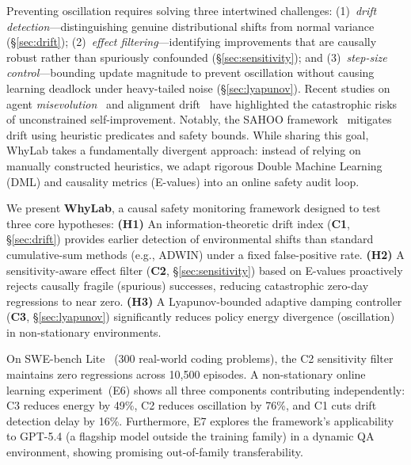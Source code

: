 \documentclass{article}
\begin{document}
Preventing oscillation requires solving three intertwined challenges:
(1)~\emph{drift detection}---distinguishing genuine distributional
shifts from normal variance (\S\ref{sec:drift});
(2)~\emph{effect filtering}---identifying improvements that are
causally robust rather than spuriously confounded
(\S\ref{sec:sensitivity}); and
(3)~\emph{step-size control}---bounding update magnitude to prevent
oscillation without causing learning deadlock under heavy-tailed noise
(\S\ref{sec:lyapunov}).
Recent studies on agent \emph{misevolution}~\cite{misevolution2025} and alignment drift~\cite{sahoo2026sahoo} have highlighted the catastrophic risks of unconstrained self-improvement. Notably, the SAHOO framework~\cite{sahoo2026sahoo} mitigates drift using heuristic predicates and safety bounds. While sharing this goal, WhyLab takes a fundamentally divergent approach: instead of relying on manually constructed heuristics, we adapt rigorous Double Machine Learning (DML) and causality metrics (E-values) into an online safety audit loop.

We present \textbf{WhyLab}, a causal safety monitoring framework designed to test three core hypotheses:
\textbf{(H1)} An information-theoretic drift index (\textbf{C1}, \S\ref{sec:drift}) provides earlier detection of environmental shifts than standard cumulative-sum methods (e.g., ADWIN) under a fixed false-positive rate.
\textbf{(H2)} A sensitivity-aware effect filter (\textbf{C2}, \S\ref{sec:sensitivity}) based on E-values proactively rejects causally fragile (spurious) successes, reducing catastrophic zero-day regressions to near zero.
\textbf{(H3)} A Lyapunov-bounded adaptive damping controller (\textbf{C3}, \S\ref{sec:lyapunov}) significantly reduces policy energy divergence (oscillation) in non-stationary environments.

On SWE-bench Lite~\cite{jimenez2024swebench} (300 real-world coding
problems), the C2 sensitivity filter maintains zero regressions
across 10{,}500 episodes.
A non-stationary online learning experiment~(E6) shows all three
components contributing independently: C3 reduces energy by 49\%,
C2 reduces oscillation by 76\%, and C1 cuts drift detection delay
by 16\%.
Furthermore, E7 explores the framework's applicability to GPT-5.4
(a flagship model outside the training family) in a dynamic QA
environment, showing promising out-of-family transferability.
\end{document}
